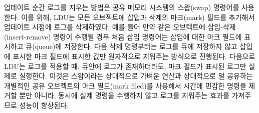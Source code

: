 
업데이트 순간 로그를 지우는 방법은 공유 메모리 시스템의 스왑(swap) 명령어를 사용한다.
이를 위해, LDU는 모든 오브젝트에 삽입과 삭제의 마크(mark) 필드를 추가해서 업데이트 시점에 로그를 
삭제하였다. 
예를 들어 만약 같은 오브텍트에 삽입-삭제(insert-remove) 명령이 수행될 경우 처음 삽입 명령어는
삽입에 대한 마크 필드에 표시하고 큐(queue)에 저장한다. 
다음 삭제 명령부터는 로그를 큐에 저장하지 않고 삽입에 표시한 마크 필드에 표시한 값만
원자적으로 지워주는 방식으로 진행된다.
다음으로 LDU는 로그를 적용할 때, 큐안에 로그가 존재하더라도, 마크 필드가 표시된 로그만 
실제로 실행한다.
이것은 스왑이라는 상대적으로 가벼운 연산과 상대적으로 덜 공유하는 개별적인 공유 오브젝트의
마크 필드(mark filed)를 사용해서 시간에 민감한 명령을 제거할 뿐만 아니라, 동시에 실제
명령을 수행하지 않고 로그를 지워주는 효과를 가져주므로 성능이 향상된다. 



